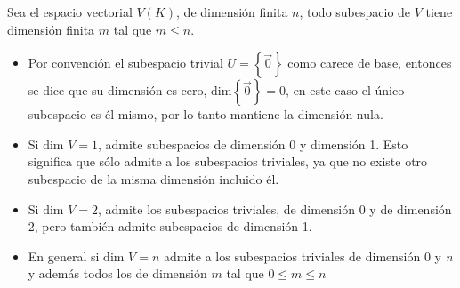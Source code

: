 Sea el espacio vectorial \(V(K)\), de dimensión finita \(n\), todo subespacio de \(V\) tiene dimensión finita \(m\) tal que \(m \leq n\).

\begin{itemize}
  \item Por convención el subespacio trivial \(U=\left\{\vec{0}\right\}\) como carece de base, entonces se dice que su dimensión es cero, \(\text{dim}\left\{\vec{0}\right\}=0\), en este caso el único subespacio es él mismo, por lo tanto mantiene la dimensión nula.
  \item Si \(\text{dim }V=1\), admite subespacios de dimensión 0 y dimensión 1. Esto significa que sólo admite a los subespacios triviales, ya que no existe otro subespacio de la misma dimensión incluido él.
  \item Si \(\text{dim }V = 2\), admite los subespacios triviales, de dimensión 0 y de dimensión 2, pero también admite subespacios de dimensión 1.
  \item En general si \(\text{dim }V=n\) admite a los subespacios triviales de dimensión 0 y \textit{n} y además todos los de dimensión \(m\) tal que \(0 \leq m \leq n\)
\end{itemize}